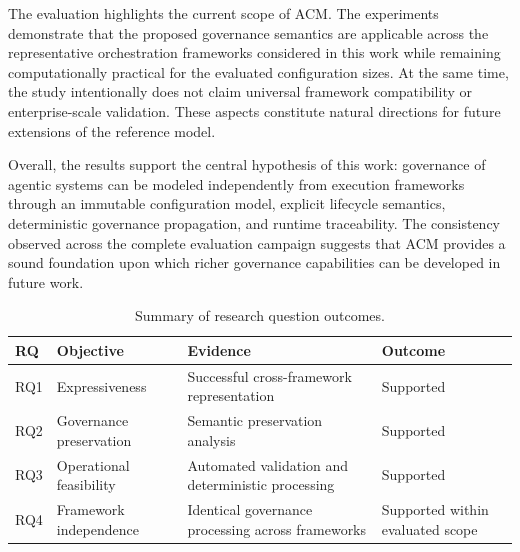 \documentclass[10pt]{article}
\begin{document}
The evaluation highlights the current scope of ACM. The experiments
demonstrate that the proposed governance semantics are applicable across the
representative orchestration frameworks considered in this work while remaining
computationally practical for the evaluated configuration sizes. At the same
time, the study intentionally does not claim universal framework compatibility
or enterprise-scale validation. These aspects constitute natural directions for
future extensions of the reference model.

Overall, the results support the central hypothesis of this work: governance of
agentic systems can be modeled independently from execution frameworks through
an immutable configuration model, explicit lifecycle semantics, deterministic
governance propagation, and runtime traceability. The consistency observed
across the complete evaluation campaign suggests that ACM provides a sound
foundation upon which richer governance capabilities can be developed in future
work.

\begin{table}[ht]

\centering

\caption{Summary of research question outcomes.}

\label{tab:rq_summary}

\begin{tabular}{p{1cm}p{2.7cm}p{5cm}p{2cm}}

\toprule

\textbf{RQ} &
\textbf{Objective} &
\textbf{Evidence} &
\textbf{Outcome}

\\

\midrule

RQ1 &
Expressiveness &
Successful cross-framework representation &
Supported

\\

RQ2 &
Governance preservation &
Semantic preservation analysis &
Supported

\\

RQ3 &
Operational feasibility &
Automated validation and deterministic processing &
Supported

\\

RQ4 &
Framework independence &
Identical governance processing across frameworks &
Supported within evaluated scope

\\

\bottomrule

\end{tabular}

\end{table}
\end{document}
